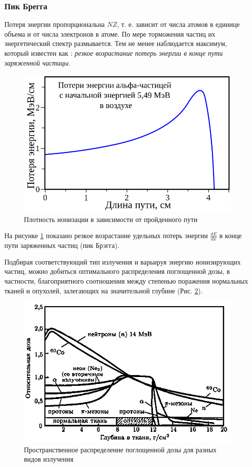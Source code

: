\documentclass[a4paper, 14pt]{article}
\renewcommand{\emph}[1]{{\color{orange}{\textit{\textbf{#1}}}}}
\begin{document}
\subsubsection{Пик Брегга}
Потеря энергии пропорциональна $NZ$, т. е. зависит от числа атомов в единице
объема и от числа электронов в атоме. По мере торможения частиц их энергетический
спектр размывается. Тем не менее наблюдается максимум, который известен как \emph{пик
Брегга}: \textit{резкое возрастание потерь энергии в конце пути заряженной частицы}.
\begin{figure}[htbp]
    \centering
    \includegraphics[width=.5\textwidth]{BraggPeak}
    \caption{Плотность ионизации в зависимости от пройденного пути}
    \label{Breg'sPeak}
\end{figure}
На рисунке \ref{Breg'sPeak} показано резкое возрастание удельных потерь энергии $\frac{dE}{dx}$ в конце пути заряженных частиц (пик Брэгга).

Подбирая соответствующий тип излучения и варьируя энергию ионизирующих частиц, можно добиться оптимального распределения поглощенной дозы, в частности, благоприятного соотношения между степенью поражения нормальных тканей и опухолей, залегающих на значительной глубине (Рис. \ref{spaceDistribution}).


\begin{figure}[htbp]
    \centering
    \includegraphics[width=.7\textwidth]{SpaceDistibution.png} %
    \caption{Пространственное распределение поглощенной дозы для разных видов излучения}
    \label{spaceDistribution}
\end{figure}
\end{document}
